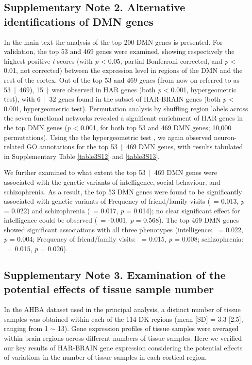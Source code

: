 \begin{refsection}
\subsection*{Supplementary Note 2. Alternative identifications of DMN genes}
In the main text the analysis of the top 200 DMN genes is presented. For validation, the top 53 and 469 genes were examined, showing respectively the highest positive \textit{t} scores (with \textit{p} < 0.05, partial Bonferroni corrected, and \textit{p} < 0.01, not corrected) between the expression level in regions of the DMN and the rest of the cortex. Out of the top 53 and 469 genes (from now on referred to as 53\ $\vert$\ 469), 15\ $\vert$\ were observed in HAR genes (both \textit{p} < 0.001, hypergeometric test), with 6\ $\vert$\ 32 genes found in the subset of HAR-BRAIN genes (both \textit{p} < 0.001, hypergeometric test). Permutation analysis by shuffling region labels across the seven functional networks revealed a significant enrichment of HAR genes in the top DMN genes (\textit{p} < 0.001, for both top 53 and 469 DMN genes; 10,000 permutations). Using the the hypergeometric test \citep{watanabe2017functional}, we again observed neuron-related GO annotations for the top 53\ $\vert$\ 469 DMN genes, with results tabulated in Supplementary Table \ref{table3S12} and \ref{table3S13}.

We further examined to what extent the top 53\ $\vert$\ 469 DMN genes were associated with the genetic variants of intelligence, social behaviour, and schizophrenia. As a result, the top 53 DMN genes were found to be significantly associated with genetic variants of Frequency of friend/family visits (\textbeta\ = 0.013, \textit{p} = 0.022) and schizophrenia (\textbeta\ = 0.017, \textit{p} = 0.014); no clear significant effect for intelligence could be observed (\textbeta\ = -0.001, \textit{p} = 0.568). The top 469 DMN genes showed significant associations with all three phenotypes (intelligence: \textbeta\ = 0.022, \textit{p} = 0.004; Frequency of friend/family visits: \textbeta\ = 0.015, \textit{p} = 0.008; schizophrenia: \textbeta\ = 0.015, \textit{p} = 0.026).

\subsection*{Supplementary Note 3. Examination of the potential effects of tissue sample number}
In the AHBA dataset used in the principal analysis, a distinct number of tissue samples was obtained within each of the 114 DK regions (mean [SD] = 3.3 [2.5], ranging from 1 $ \sim $  13). Gene expression profiles of tissue samples were averaged within brain regions across different numbers of tissue samples. Here we verified our key results of HAR-BRAIN gene expression considering the potential effects of variations in the number of tissue samples in each cortical region.


\end{refsection}
